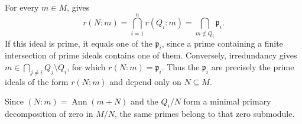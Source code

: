 For every $m\in M$,  gives
\[r(N:m)=\bigcap_{i=1}^nr(Q_i:m)=\bigcap_{m\notin Q_i}\mathfrak{p}_i.\]
If this ideal is prime, it equals one of the $\mathfrak{p}_i$, since a prime containing a finite intersection of prime ideals contains one of them. Conversely, irredundancy gives $m\in\bigcap_{j\ne i}Q_j\setminus Q_i$, for which $r(N:m)=\mathfrak{p}_i$. Thus the $\mathfrak{p}_i$ are precisely the prime ideals of the form $r(N:m)$ and depend only on $N\subseteq M$.

Since $(N:m)=\operatorname{Ann}(m+N)$ and the $Q_i/N$ form a minimal primary decomposition of zero in $M/N$, the same primes belong to that zero submodule.

